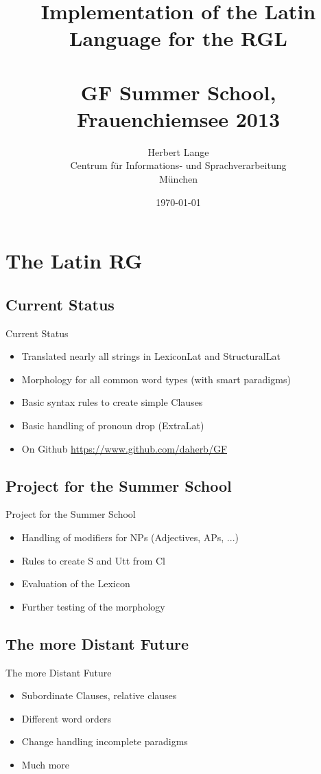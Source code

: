 \documentclass{beamer}
\title[Implementation of the Latin Language for the RGL]{Implementation of the Latin Language for the RGL\\\quad \\ \small{ GF Summer School, Frauenchiemsee 2013 }}
\author{Herbert Lange\\Centrum für Informations- und Sprachverarbeitung\\München}
\date{\today}
\begin{document}
\frame{\titlepage}

\section{The Latin RG}
\subsection{Current Status}
\begin{frame}[fragile]{Current Status}
\begin{itemize}
  \item Translated nearly all strings in LexiconLat and StructuralLat
  \item Morphology for all common word types (with smart paradigms)
  \item Basic syntax rules to create simple Clauses
  \item Basic handling of pronoun drop (ExtraLat)
  \item On Github \url{https://www.github.com/daherb/GF}
\end{itemize}
\end{frame}
\subsection{Project for the Summer School}
\begin{frame}{Project for the Summer School}
\begin{itemize}
  \item Handling of modifiers for NPs (Adjectives, APs, ...)
  \item Rules to create S and Utt from Cl
  \item Evaluation of the Lexicon
  \item Further testing of the morphology
\end{itemize}
\end{frame}
\subsection{The more Distant Future}
\begin{frame}{The more Distant Future}
\begin{itemize}
  \item Subordinate Clauses, relative clauses
  \item Different word orders
  \item Change handling incomplete paradigms
  \item Much more
\end{itemize}
\end{frame}
\end{document}
